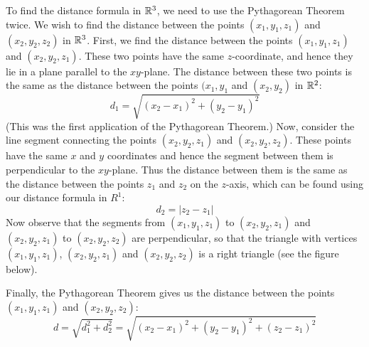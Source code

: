 \documentclass[handout]{ximera}
\begin{document}
To find the distance formula in $\mathbb R^3$, we need to use the Pythagorean Theorem twice.
We wish to find the distance between the points $(x_1, y_1, z_1)$ and $(x_2, y_2, z_2)$ in $\mathbb R^3$.
First, we find the distance between the points $(x_1, y_1, z_1)$ and $(x_2, y_2, z_1)$.  These two points have the same $z$-coordinate, and hence they lie
in a plane parallel to the $xy$-plane.  The distance between these two points is the same as the distance between the points $(x_1, y_1$ and $(x_2, y_2)$
in $\mathbb R^2$:
\[
d_1 = \sqrt{(x_2 -x_1)^2 + (y_2 - y_1)^2}
\]
(This was the first application of the Pythagorean Theorem.) Now, consider the line segment connecting the points $(x_2, y_2, z_1)$  and $(x_2, y_2, z_2)$.
These points have the same $x$ and $y$ coordinates and hence the segment between them is perpendicular to the $xy$-plane. 
Thus the distance between them is the same as the distance between the points $z_1$ and $z_2$ on the $z$-axis, which can be found using our distance formula in $R^1$:
\[
d_2 = |z_2 -z_1|
\]
Now observe that the segments from $(x_1, y_1, z_1)$ to $(x_2, y_2, z_1)$ and $(x_2, y_2, z_1)$ to $(x_2, y_2, z_2)$ are perpendicular, 
so that the triangle with vertices $(x_1, y_1, z_1)$, $(x_2, y_2, z_1)$ and $(x_2, y_2, z_2)$ is a right triangle (see the figure below).





\begin{image}
\end{image}

Finally, the Pythagorean Theorem gives us the distance between the points $(x_1, y_1, z_1)$ and $(x_2, y_2, z_2)$:
\[
d = \sqrt{d_1^2 +d_2^2} = \sqrt{(x_2 -x_1)^2+(y_2 -y_1)^2+(z_2 -z_1)^2}
\]
\end{document}
